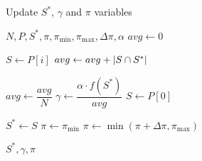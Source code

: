 \begin{algorithm}[h]
  \caption{Update $S^{*}$, $\gamma$ and $\pi$ variables}\label{alg:GENETIKUS-ALGORITMUS:UPDATE}
  \begin{algorithmic}[1]
    \Require $N, P, S^{*}, \pi, \pi_{\min}, \pi_{\max}, \Delta \pi, \alpha$
    \State $avg \leftarrow 0$

    \State $S \leftarrow P\left[ i \right]$
    \State $avg \leftarrow avg + \lvert S \cap S^{*}\rvert$
    \EndFor

    \State $avg \leftarrow \dfrac{avg}{N}$
    \State $\gamma \leftarrow \dfrac{\alpha \cdot f(S^{*})}{avg}$
    \State $S \leftarrow P\left[ 0 \right]$

    \State $S^{*} \leftarrow S$
    \State $\pi \leftarrow \pi_{\min}$
    \Else
    \State $\pi \leftarrow \min(\pi + \Delta \pi, \pi_{\max})$
    \EndIf

    \State \Return $S^{*}, \gamma, \pi$
  \end{algorithmic}
\end{algorithm}
